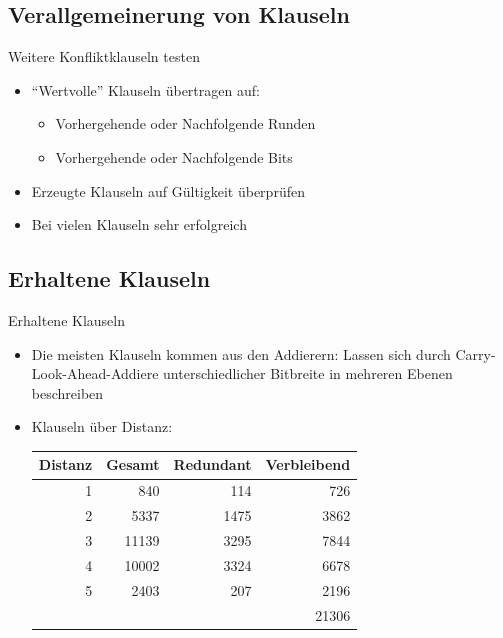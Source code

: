 \documentclass{beamer}
\begin{document}
  \subsection{Verallgemeinerung von Klauseln}
    \begin{frame}{Weitere Konfliktklauseln testen}
      \begin{itemize}
        \setlength{\itemsep}{20pt}
        \item "`Wertvolle"' Klauseln übertragen auf:
        \begin{itemize}
          \item Vorhergehende oder Nachfolgende Runden
          \item Vorhergehende oder Nachfolgende Bits
        \end{itemize}
        \item Erzeugte Klauseln auf Gültigkeit überprüfen
        \item Bei vielen Klauseln sehr erfolgreich
      \end{itemize}
    \end{frame}
  \subsection{Erhaltene Klauseln}
    \begin{frame}{Erhaltene Klauseln}
      \begin{itemize}
        \item Die meisten Klauseln kommen aus den Addierern: Lassen sich durch Carry-Look-Ahead-Addiere unterschiedlicher Bitbreite in mehreren Ebenen beschreiben
        \item Klauseln über Distanz:\newline
        \begin{tabular}{rrrr}
          Distanz & Gesamt & Redundant & Verbleibend\\
          \hline
                1 &    840 &       114 &   726\\
                2 &   5337 &      1475 &  3862\\
                3 &  11139 &      3295 &  7844\\
                4 &  10002 &      3324 &  6678\\
                5 &   2403 &       207 &  2196\\
          \hline
                  &        &           & 21306
        \end{tabular}
      \end{itemize}
    \end{frame}
\end{document}
